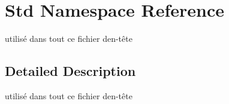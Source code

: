 \hypertarget{namespace_std}{}\section{Std Namespace Reference}
\label{namespace_std}


utilisé dans tout ce fichier d\textquotesingle{}en-\/tête  




\subsection{Detailed Description}
utilisé dans tout ce fichier d\textquotesingle{}en-\/tête 